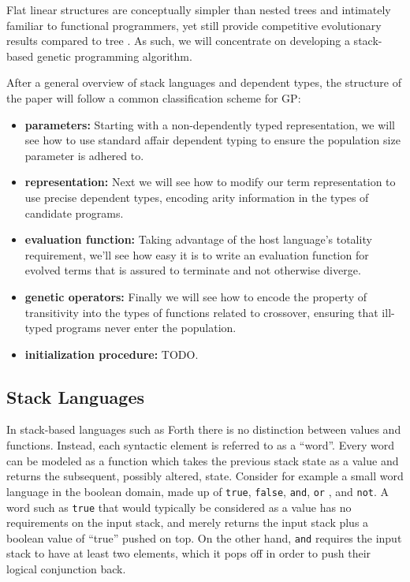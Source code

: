 \documentclass{acm_proc_article-sp}
\begin{document}
Flat linear structures are conceptually simpler than nested trees and
intimately familiar to functional programmers, yet still provide
competitive evolutionary results compared to tree \cite{tchernev:crossmethods}.
As such, we will concentrate on developing a stack-based
genetic programming algorithm.

After a general overview of stack languages and dependent types, the
structure of the paper will follow a common classification scheme for
GP:
\begin{itemize}
\item{\textbf{parameters:}} Starting with a non-dependently typed
  representation, we will see how to use standard affair dependent
  typing to ensure the population size parameter is adhered to.
\item{\textbf{representation:}} Next we will see how to modify our
  term representation to use precise dependent types, encoding arity
  information in the types of candidate programs.
\item{\textbf{evaluation function:}} Taking advantage of the host
  language's totality requirement, we'll see how easy it is to write
  an evaluation function for evolved terms that is assured to
  terminate and not otherwise diverge.
\item{\textbf{genetic operators:}} Finally we will see how to encode
  the property of transitivity into the types of functions related to
  crossover, ensuring that ill-typed programs never enter the
  population.
\item{\textbf{initialization procedure:}} TODO.
\end{itemize}

\subsection{Stack Languages}

In stack-based languages such as Forth \cite{kelly:forth} there is no
distinction between values and functions. Instead, each syntactic
element is referred to as a ``word''. Every word can be modeled as a
function which takes the previous stack state as a value and returns
the subsequent, possibly altered, state. Consider for example a
small word language in the boolean domain, made up of \texttt{true},
\texttt{false}, \texttt{and}, \texttt{or} , and \texttt{not}. A word
such as \texttt{true} that would typically be considered as a value
has no requirements on the input stack, and merely returns the input
stack plus a boolean value of ``true'' pushed on top. On the other
hand, \texttt{and} requires the input stack to have at least two elements,
which it pops off in order to push their logical conjunction
back.
\end{document}

